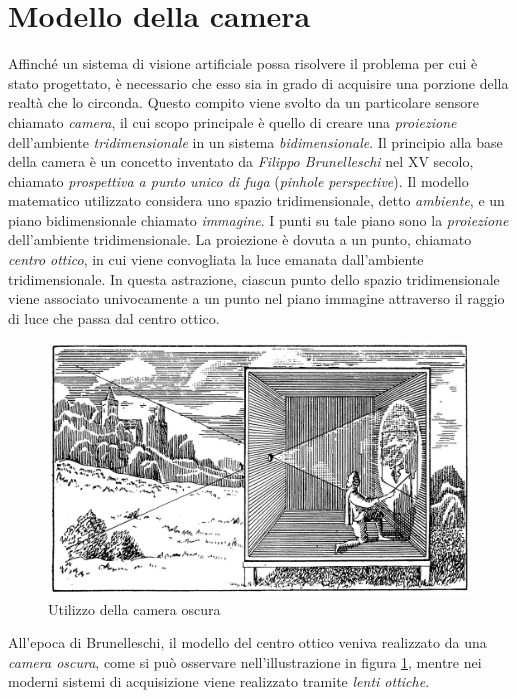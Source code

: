\section{Modello della camera}
Affinch\'e un sistema di visione artificiale possa risolvere il problema per cui \`e stato progettato, \`e necessario che esso sia in grado di acquisire una porzione della realt\`a che lo circonda.
Questo compito viene svolto da un particolare sensore chiamato \textit{camera}, il cui scopo principale \`e quello di creare una \textit{proiezione} dell'ambiente \textit{tridimensionale} in un sistema \textit{bidimensionale}.
Il principio alla base della camera \`e un concetto inventato da \textit{Filippo Brunelleschi} nel XV secolo, chiamato \textit{prospettiva a punto unico di fuga} (\textit{pinhole perspective}).
Il modello matematico utilizzato considera uno spazio tridimensionale, detto \textit{ambiente}, e un piano bidimensionale chiamato \textit{immagine}. 
I punti su tale piano sono la \textit{proiezione} dell'ambiente tridimensionale.
La proiezione \`e dovuta a un punto, chiamato \textit{centro ottico}, in cui viene convogliata la luce emanata dall'ambiente tridimensionale.
In questa astrazione, ciascun punto dello spazio tridimensionale viene associato univocamente a un punto nel piano immagine attraverso il raggio di luce che passa dal centro ottico.
\begin{figure}
	\centering
	\includegraphics[width=12cm]{./pictures/prospettiva}
	\caption{Utilizzo della camera oscura}
	\label{fig:prospettiva}
\end{figure} 
All'epoca di Brunelleschi, il modello del centro ottico veniva realizzato da una \textit{camera oscura}, come si pu\`o osservare nell'illustrazione in figura \ref{fig:prospettiva}, mentre nei moderni sistemi di acquisizione viene realizzato tramite \textit{lenti ottiche}. 
